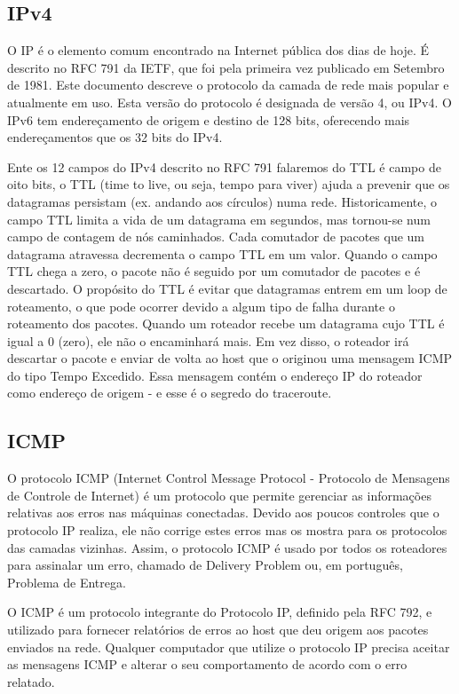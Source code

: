 \documentclass[
	article,			%
	11pt,				%
	oneside,			%
	a4paper,			%
	english,			%
	brazil,				%
	sumario=tradicional
	]{abntex2}
\begin{document}
\subsection{IPv4}
O IP é o elemento comum encontrado na Internet pública dos dias de hoje. É descrito no RFC 791 da IETF, que foi pela primeira vez publicado em Setembro de 1981. Este documento descreve o protocolo da camada de rede mais popular e atualmente em uso. Esta versão do protocolo é designada de versão 4, ou IPv4. O IPv6 tem endereçamento de origem e destino de 128 bits, oferecendo mais endereçamentos que os 32 bits do IPv4.

Ente os 12 campos do IPv4 descrito no RFC 791 falaremos do TTL é campo de oito bits, o TTL (time to live, ou seja, tempo para viver) ajuda a prevenir que os datagramas persistam (ex. andando aos círculos) numa rede. Historicamente, o campo TTL limita a vida de um datagrama em segundos, mas tornou-se num campo de contagem de nós caminhados. Cada comutador de pacotes que um datagrama atravessa decrementa o campo TTL em um valor. Quando o campo TTL chega a zero, o pacote não é seguido por um comutador de pacotes e é descartado.
O propósito do TTL é evitar que datagramas entrem em um loop de roteamento, o que pode ocorrer devido a algum tipo de falha durante o roteamento dos pacotes. Quando um roteador recebe um datagrama cujo TTL é igual a 0 (zero), ele não o encaminhará mais. Em vez disso, o roteador irá descartar o pacote e enviar de volta ao host que o originou uma mensagem ICMP do tipo Tempo Excedido. Essa mensagem contém o endereço IP do roteador como endereço de origem - e esse é o segredo do traceroute.\cite{boson}


\subsection{ICMP}

O protocolo ICMP (Internet Control Message Protocol - Protocolo de Mensagens de Controle de Internet) é um protocolo que permite gerenciar as informações relativas aos erros nas máquinas conectadas. Devido aos poucos controles que o protocolo IP realiza, ele não corrige estes erros mas os mostra para os protocolos das camadas vizinhas. Assim, o protocolo ICMP é usado por todos os roteadores para assinalar um erro, chamado de Delivery Problem ou, em português, Problema de Entrega. 

O ICMP é um protocolo integrante do Protocolo IP, definido pela RFC 792, e utilizado para fornecer relatórios de erros ao host que deu origem aos pacotes enviados na rede. Qualquer computador que utilize o protocolo IP precisa aceitar as mensagens ICMP e alterar o seu comportamento de acordo com o erro relatado.
\end{document}

